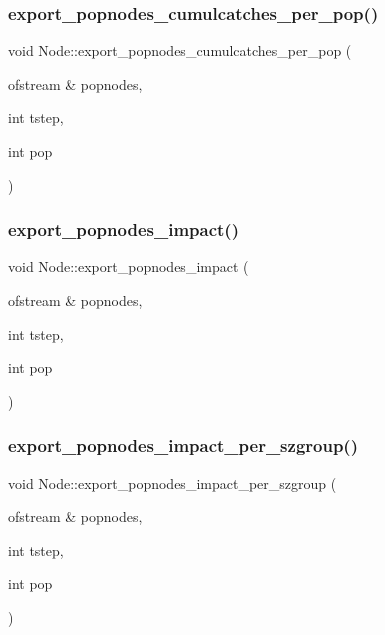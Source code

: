 \mbox{\label{class_node_a9e51b332476fac151e0a4f8c4fe445f6}} 
\subsubsection{\texorpdfstring{export\_popnodes\_cumulcatches\_per\_pop()}{export\_popnodes\_cumulcatches\_per\_pop()}}
{\footnotesize\ttfamily void Node\+::export\+\_\+popnodes\+\_\+cumulcatches\+\_\+per\+\_\+pop (\begin{DoxyParamCaption}\item[{ofstream \&}]{popnodes,  }\item[{int}]{tstep,  }\item[{int}]{pop }\end{DoxyParamCaption})}

\mbox{\label{class_node_a85e68dd40198e604fa25f73354d90c3a}} 
\subsubsection{\texorpdfstring{export\_popnodes\_impact()}{export\_popnodes\_impact()}}
{\footnotesize\ttfamily void Node\+::export\+\_\+popnodes\+\_\+impact (\begin{DoxyParamCaption}\item[{ofstream \&}]{popnodes,  }\item[{int}]{tstep,  }\item[{int}]{pop }\end{DoxyParamCaption})}

\mbox{\label{class_node_a9a975577423e8eee727df5ceef3c0c08}} 
\subsubsection{\texorpdfstring{export\_popnodes\_impact\_per\_szgroup()}{export\_popnodes\_impact\_per\_szgroup()}}
{\footnotesize\ttfamily void Node\+::export\+\_\+popnodes\+\_\+impact\+\_\+per\+\_\+szgroup (\begin{DoxyParamCaption}\item[{ofstream \&}]{popnodes,  }\item[{int}]{tstep,  }\item[{int}]{pop }\end{DoxyParamCaption})}

